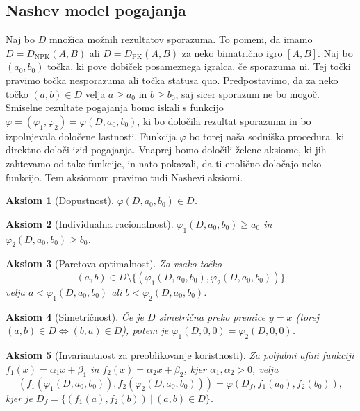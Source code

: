 \documentclass[10pt, a4paper]{article}
\newtheorem{aksiom}{Aksiom}[section]
\begin{document}
\subsection{Nashev model pogajanja}

Naj bo $D$ množica možnih rezultatov sporazuma.
To pomeni, da imamo $D = D_{\mathrm{NPK}} (A, B)$ ali $D = D_{\mathrm{PK}} (A, B)$
za neko bimatrično igro $[A, B]$. Naj bo $(a_0, b_0)$
točka, ki pove dobiček posameznega igralca, če sporazuma ni.
Tej točki pravimo {točka nesporazuma} ali {točka statusa quo}.
Predpostavimo, da za neko točko $(a, b) \in D$ velja $a \geq a_0$ in $b \geq b_0$,
saj sicer sporazum ne bo mogoč. Smiselne rezultate pogajanja bomo 
iskali s funkcijo $\varphi = (\varphi_1, \varphi_2) = \varphi(D, a_0, b_0)$,
ki bo določila rezultat sporazuma in bo izpolnjevala določene lastnosti.
Funkcija $\varphi$ bo torej naša sodniška procedura, ki direktno določi izid pogajanja.
Vnaprej bomo določili želene aksiome, ki jih zahtevamo od take funkcije, in nato pokazali,
da ti enolično določajo neko funkcijo. Tem aksiomom pravimo tudi {Nashevi aksiomi}.

\begin{aksiom}[Dopustnost]
  $\varphi(D, a_0, b_0) \in D$.
\end{aksiom}

\begin{aksiom}[Individualna racionalnost]
  $\varphi_1 (D, a_0, b_0) \geq a_0$ in $\varphi_2 (D, a_0, b_0) \geq b_0$.
\end{aksiom}

\begin{aksiom}[Paretova optimalnost]
  Za vsako točko 
  $$(a, b) \in D \setminus \{(\varphi_1 (D, a_0, b_0), \varphi_2 (D, a_0, b_0))\}$$
  velja $a < \varphi_1 (D, a_0, b_0)$ ali $b < \varphi_2 (D, a_0, b_0)$.
\end{aksiom}

\begin{aksiom}[Simetričnost]
  Če je $D$ simetrična preko premice $y = x$ (torej $(a, b) \in D \Leftrightarrow (b, a) \in D$),
  potem je $\varphi_1(D, 0, 0) = \varphi_2 (D, 0, 0)$.
\end{aksiom}

\begin{aksiom}[Invariantnost za preoblikovanje koristnosti]
  Za poljubni afini funkciji $f_1 (x) = \alpha_1 x + \beta_1$ in $f_2 (x) = \alpha_2 x + \beta_2$,
  kjer $\alpha_1, \alpha_2 > 0$, velja 
  $$(f_1(\varphi_1(D, a_0, b_0)), f_2 (\varphi_2(D, a_0, b_0))) = \varphi (D_f, f_1 (a_0), f_2 (b_0)),$$
  kjer je $D_f = \{(f_1(a), f_2(b))\ |\ (a, b) \in D\}$.
\end{aksiom}
\end{document}
